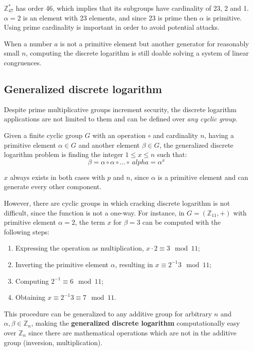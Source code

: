 $\mathbb{Z}^*_{47}$ has order 46, which implies that its subgroups have cardinality of 23, 2 and 1. $\alpha = 2$ is an element with 23 elements, and since 23 is prime then $\alpha$ is primitive. Using prime cardinality is important in order to avoid potential attacks.

When a number $a$ is not a primitive element but another generator for reasonably small $n$, computing the discrete logarithm is still doable solving a system of linear congruences.

\subsection{Generalized discrete logarithm}
Despite prime multiplicative groups increment security, the discrete logarithm applications are not limited to them and can be defined over \textit{any cyclic group}.

Given a finite cyclic group $G$ with an operation $\circ$ and cardinality $n$, having a primitive element $\alpha \in G$ and another element $\beta \in G$, the generalized discrete logarithm problem is finding the integer $1 \leq x \leq n$ such that:
$$\beta = \alpha \circ \alpha \circ \dots \circ \ alpha = \alpha^x$$

$x$ always exists in both cases with $p$ and $n$, since $\alpha$ is a primitive element and can generate every other component. 

However, there are cyclic groups in which cracking discrete logarithm is not difficult, since the function is not a one-way. For instance, in $G = (\mathbb{Z}_{11}, +)$ with primitive element $\alpha = 2$, the term $x$ for $\beta = 3$ can be computed with the following steps:
\begin{enumerate}
	\item Expressing the operation as multiplication, $x \cdot 2 \equiv 3 \mod 11$;
	\item Inverting the primitive element $\alpha$, resulting in $x \equiv 2^{-1}3 \mod 11$;
	\item Computing $2^{-1} \equiv 6 \mod 11$;
	\item Obtaining $x \equiv 2^{-1}3 \equiv 7 \mod 11$.
\end{enumerate}
This procedure can be generalized to any additive group for arbitrary $n$ and $\alpha, \beta \in \mathbb{Z}_n$, making the \textbf{generalized discrete logarithm} computationally easy over $\mathbb{Z}_n$ since there are mathematical operations which are not in the additive group (inversion, multiplication). 

